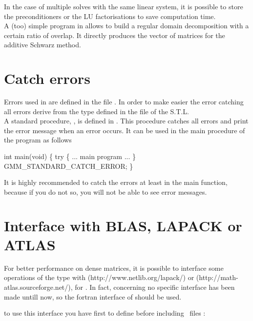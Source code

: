 \documentclass[11pt,a4paper]{article}
\begin{document}
In the case of multiple solves with the same linear system, it is possible to store the preconditioners or the LU factorisations to save computation time.\\

A (too) simple program in  allows to build a regular domain decomposition with a certain ratio of overlap. It directly produces the vector of matrices  for the additive Schwarz method.

\section{Catch errors}

Errors used in \gmm are defined in the file . In order to make easier  the error catching all errors derive from the type  defined in the file  of the S.T.L.\\[0.5cm]
A standard procedure, , is defined in . This procedure catches all errors and print the error message when an error occurs. It can be used in the main procedure of the program as follows\\[0.5cm]
\begin{cppcode}
  int main(void) \{ 
    try \{ 
      ... main program ... 
        \} 
     GMM\_STANDARD\_CATCH\_ERROR;
  \}
\end{cppcode}

It is highly recommended to catch the errors at least in the main function, because if you do not so, you will not be able to see error messages.

\section{Interface with BLAS, LAPACK or ATLAS}
 

For better performance on dense matrices, it is possible to interface some operations of the type  with  (http://www.netlib.org/lapack/) or  (http://math-atlas.sourceforge.net/), for . In fact, concerning  no specific interface has been made untill now, so the fortran interface of  should be used.

to use this interface you have first to define  before including \gmm \ files :
\end{document}
